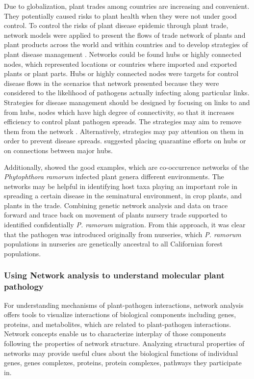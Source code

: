 \documentclass[12pt, oneside]{report}
\begin{document}
Due to globalization, plant trades among countries are increasing and convenient. They potentially caused risks to plant health when they were not under good control. To control the risks of plant disease epidemic through plant trade, network models were applied to present the flows of trade network of plants and plant products across the world and within countries and to develop strategies of plant disease management \citep{pautasso2015network}. Networks could be found hubs or highly connected nodes, which represented locations or countries where imported and exported plants or plant parts. Hubs or highly connected nodes were targets for control disease flows in the scenarios that network presented because they were considered to the likelihood of pathogens actually infecting along particular links. Strategies for disease management should be designed by focusing on links to and from hubs, nodes which have high degree of connectivity, so that it increases efficiency to control plant pathogen spreads. The strategies may aim to remove them from the network \citep{Jeger:2007tn, Lefebvre:2011fo}. Alternatively, strategies may pay attention on them in order to prevent disease spreads. \citet{Shaw:2014cka} suggested placing quarantine efforts on hubs or on connections between major hubs.

Additionally, \citet{pautasso2008epidemiological} showed the good examples, which are co-occurrence networks of the \textit{Phytophthora ramorum} infected plant genera different environments. The networks may be helpful in identifying host taxa playing an important role in spreading a certain disease in the seminatural environment, in crop plants, and plants in the trade. Combining genetic network analysis and data on trace forward and trace back on movement of plants nursery trade supported to identified confidentially \textit{P. ramorum} migration. From this approach, it was clear that the pathogen was introduced originally from nurseries, which \textit{P. ramorum} populations in nurseries are genetically ancestral to all Californian forest populations.

\subsubsection*{Using Network analysis to understand molecular plant pathology}

For understanding mechanisms of plant-pathogen interactions, network analysis offers tools to visualize interactions of biological components including genes, proteins, and metabolites, which are related to plant-pathogen interactions. Network concepts enable us to characterize interplay of those components following the properties of network structure. Analyzing structural properties of networks may provide useful clues about the biological functions of individual genes, genes complexes, proteins, protein complexes, pathways they participate in.
\end{document}
